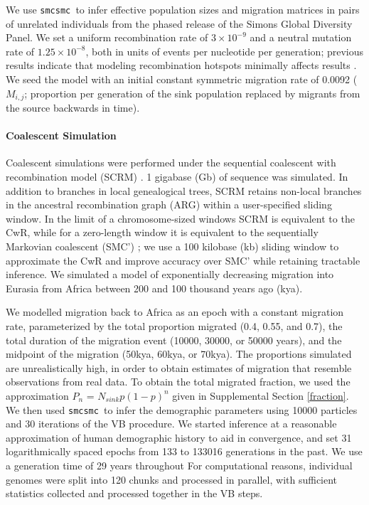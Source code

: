 \documentclass{article}
\newcommand{\SMC}{{\tt smcsmc }}
\begin{document}
We use \SMC to infer effective population sizes and migration matrices in pairs of unrelated individuals from the phased release of the Simons Global Diversity Panel. We set a uniform recombination rate of $3\times10^{-9}$ and a neutral mutation rate of $1.25\times10^{-8}$, both in units of events per nucleotide per generation; previous results indicate that modeling recombination
hotspots minimally affects results \cite{Li2011}. %
We seed the model with an initial constant symmetric  migration rate of 0.0092 ($M_{i,j}$; proportion per generation of the sink population replaced by migrants from the source backwards in time).

\paragraph{Coalescent Simulation} Coalescent simulations were performed under the sequential coalescent with recombination model (SCRM) \cite{Staab2015}. 1 gigabase (Gb) of sequence was simulated.  In addition to branches in local
genealogical trees, SCRM retains non-local
branches in the ancestral recombination
graph (ARG) within a user-specified sliding
window.  In the limit of a chromosome-sized
windows SCRM is equivalent to the CwR, while
for a zero-length window it is equivalent to
the sequentially Markovian coalescent (SMC')
\cite{McVeanCardin2005,Marjoram2006}; we use a
100 kilobase (kb) sliding window to approximate the CwR and improve accuracy over SMC' while retaining tractable inference. We simulated a model of exponentially decreasing migration into Eurasia from Africa between 200 and 100 thousand years ago (kya).

We modelled migration back to Africa as an epoch  with a constant migration rate, parameterized by the total proportion migrated (0.4, 0.55, and 0.7), 
the total duration of the migration event (10000, 30000, or 50000 years), and the midpoint of the migration (50kya, 60kya, or 70kya). The proportions simulated are unrealistically high, in order to obtain estimates of migration that resemble observations from real data. To obtain the total migrated fraction, we used the approximation $P_n$ = $N_{sink} p(1-p)^n$ given in Supplemental Section \ref{fraction}. We then used \SMC to infer the demographic parameters using 10000 particles and 30 iterations of the VB procedure. We started inference at a reasonable approximation of human demographic history to aid in convergence, and set 31 logarithmically spaced epochs from 133 to 133016 generations in the past. We use a generation
time of 29 years throughout %
For computational reasons, individual genomes were split into 120 chunks and processed in parallel, with sufficient statistics collected and
processed together in the VB steps.
\end{document}
